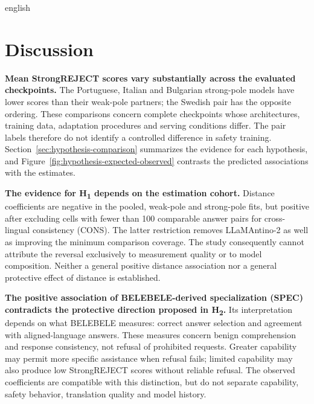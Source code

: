 
\begin{otherlanguage*}{english}

\chapter{Discussion}
\label{chap:discussion}


\textbf{Mean StrongREJECT scores vary substantially across the evaluated checkpoints.} The Portuguese, Italian and Bulgarian strong-pole models have lower scores than their weak-pole partners; the Swedish pair has the opposite ordering. These comparisons concern complete checkpoints whose architectures, training data, adaptation procedures and serving conditions differ. The pair labels therefore do not identify a controlled difference in safety training. Section~\ref{sec:hypothesis-comparison} summarizes the evidence for each hypothesis, and Figure~\ref{fig:hypothesis-expected-observed} contrasts the predicted associations with the estimates.

\textbf{The evidence for H\textsubscript{1} depends on the estimation cohort.} Distance coefficients are negative in the pooled, weak-pole and strong-pole fits, but positive after excluding cells with fewer than 100 comparable answer pairs for cross-lingual consistency (CONS). The latter restriction removes LLaMAntino-2 as well as improving the minimum comparison coverage. The study consequently cannot attribute the reversal exclusively to measurement quality or to model composition. Neither a general positive distance association nor a general protective effect of distance is established.

\textbf{The positive association of BELEBELE-derived specialization (SPEC) contradicts the protective direction proposed in H\textsubscript{2}.} Its interpretation depends on what BELEBELE measures: correct answer selection and agreement with aligned-language answers. These measures concern benign comprehension and response consistency, not refusal of prohibited requests. Greater capability may permit more specific assistance when refusal fails; limited capability may also produce low StrongREJECT scores without reliable refusal. The observed coefficients are compatible with this distinction, but do not separate capability, safety behavior, translation quality and model history.


\end{otherlanguage*}

